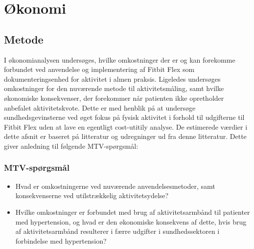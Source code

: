 \chapter{Økonomi}

\section{Metode}
I økonomianalysen undersøges, hvilke omkostninger der er og kan forekomme forbundet ved anvendelse og implementering af Fitbit Flex som dokumenteringsenhed for aktivitet i almen praksis.
Ligeledes undersøges omkostninger for den nuværende metode til aktivitetsmåling, samt hvilke økonomiske konsekvenser, der forekommer når patienten ikke opretholder anbefalet aktivitetskvote.
Dette er med henblik på at undersøge sundhedsgevinsterne ved øget fokus på fysisk aktivitet i forhold til udgifterne til Fitbit Flex uden at lave en egentligt cost-utitily analyse.   
De estimerede værdier i dette afsnit er baseret på litteratur og udregninger ud fra denne litteratur.
Dette giver anledning til følgende MTV-spørgsmål: 

\subsection{MTV-spørgsmål}
 
\begin{itemize}
\item Hvad er omkostningerne ved nuværende anvendelsesmetoder, samt konsekvenserne ved utilstrækkelig aktivitetsydelse? 

\item Hvilke omkostninger er forbundet med brug af aktivitetsarmbånd til patienter med hypertension, og hvad er den økonomiske konsekvens af dette, hvis brug af aktivitetsarmbånd resulterer i færre udgifter i sundhedssektoren i forbindelse med hypertension?

\end{itemize}
 



